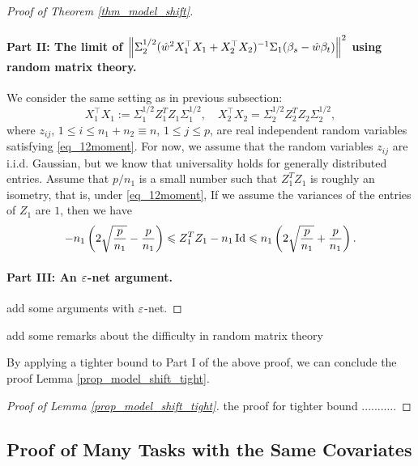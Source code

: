 \begin{proof}[Proof of Theorem \ref{thm_model_shift}]
\paragraph{Part II: The limit of $\left\| \Sigma_2^{1/2} (\hat{w}^2X_1^{\top}X_1 + X_2^{\top}X_2)^{-1}\Sigma_1 (\beta_s - \hat{w}\beta_t) \right\|^2$ using random matrix theory.}
We consider the same setting as in previous subsection:
$$ X_1^{\top}X_1:=\Sigma_1^{1/2}  Z_1^T Z_1 \Sigma_1^{1/2} ,\quad X_2^{\top}X_2= \Sigma_2^{1/2}  Z_2^T Z_2 \Sigma_2^{1/2},$$
where $z_{ij}$, $1 \leq i \leq n_1+n_2\equiv n$, $1 \leq j \leq p$, are real independent random variables satisfying \eqref{eq_12moment}. For now, we assume that the random variables $z_{ij}$ are i.i.d. Gaussian, but we know that universality holds for generally distributed entries. Assume that $p/n_1$ is a small number such that $Z_1^TZ_1$ is roughly an isometry, that is, under \eqref{eq_12moment},
{\color{blue}
If we assume the variances of the entries of $Z_1$ are $1$, then we have
\begin{align}
- {n_1} \left(2\sqrt{\frac{p}{n_1}} - {\frac{p}{n_1}}\right)  \leqslant {Z_1^T Z_1 -  n_1 \operatorname{Id}}  \leqslant {n_1} \left(2\sqrt{\frac{p}{n_1}} + {\frac{p}{n_1}}\right) . \label{eq_isometric}
\end{align}
}



\paragraph{Part III: An ${\varepsilon}$-net argument.} 

{\cor add some arguments with ${\varepsilon}$-net.}
\end{proof}

{\cor add some remarks about the difficulty in random matrix theory}

By applying a tighter bound to Part I of the above proof, we can conclude the proof Lemma \ref{prop_model_shift_tight}.

\begin{proof}[Proof of Lemma \ref{prop_model_shift_tight}]
the proof for tighter bound ........... 
\end{proof}



\subsection{Proof of Many Tasks with the Same Covariates}\label{app_proof_many_tasks}

